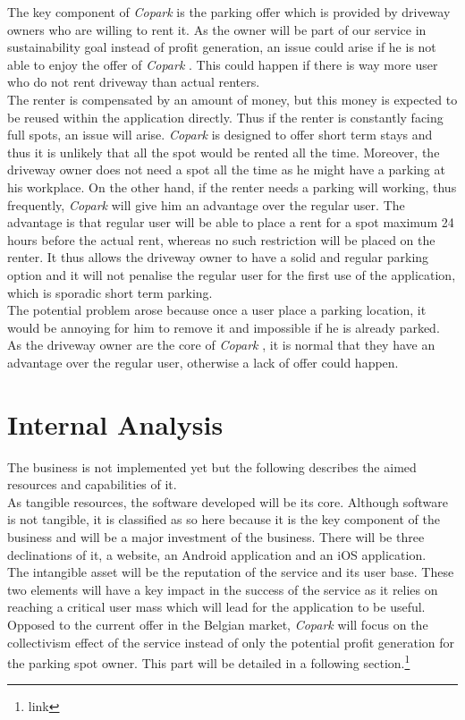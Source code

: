 \documentclass[12pt,a4paper,oneside]{book}
\newcommand{\bp}{\textit{Copark }}
\begin{document}
The key component of \bp is the parking offer which is provided by driveway owners who are willing to rent it. As the owner will be part of our service in sustainability goal instead of profit generation, an issue could arise if he is not able to enjoy the offer of \bp. This could happen if there is way more user who do not rent driveway than actual renters.\\

The renter is compensated by an amount of money, but this money is expected to be reused within the application directly. Thus if the renter is constantly facing full spots, an issue will arise. \bp is designed to offer short term stays and thus it is unlikely that all the spot would be rented all the time. Moreover, the driveway owner does not need a spot all the time as he might have a parking at his workplace. On the other hand, if the renter needs a parking will working, thus frequently, \bp will give him an advantage over the regular user. The advantage is that regular user will be able to place a rent for a spot maximum 24 hours before the actual rent, whereas no such restriction will be placed on the renter. It thus allows the driveway owner to have a solid and regular parking option and it will not penalise the regular user for the first use of the application, which is sporadic short term parking.\\

The potential problem arose because once a user place a parking location, it would be annoying for him to remove it and impossible if he is already parked. As the driveway owner are the core of \bp, it is normal that they have an advantage over the regular user, otherwise a lack of offer could happen.

\section{Internal Analysis}
The business is not implemented yet but the following describes the aimed resources and capabilities of it.\\

As tangible resources, the software developed will be its core. Although software is not tangible, it is classified as so here because it is the key component of the business and will be a major investment of the business. There will be three declinations of it, a website, an Android application and an iOS application.\\

The intangible asset will be the reputation of the service and its user base. These two elements will have a key impact in the success of the service as it relies on reaching a critical user mass which will lead for the application to be useful. Opposed to the current offer in the Belgian market, \bp will focus on the collectivism effect of the service instead of only the potential profit generation for the parking spot owner. This part will be detailed in a following section.\footnote{link}\\
\end{document}

